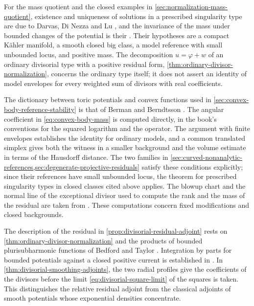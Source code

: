 For the mass quotient and the closed examples in \cref{sec:normalization-mass-quotient}, existence and uniqueness of solutions in a prescribed singularity type are due to Darvas, Di Nezza and Lu \cite[Theorems 1.4(i) and 4.29, pp.~2052 and 2079--2080]{DDNL18mono}, and the invariance of the mass under bounded changes of the potential is their \cite[Proposition 2.1, p.~2055]{DDNL18mono}. Their hypotheses are a compact K\"ahler manifold, a smooth closed big class, a model reference with small unbounded locus, and positive mass. The decomposition $u=\varphi+w$ of an ordinary divisorial type with a positive residual form, \cref{thm:ordinary-divisor-normalization}, concerns the ordinary type itself; it does not assert an identity of model envelopes for every weighted sum of divisors with real coefficients.

The dictionary between toric potentials and convex functions used in \cref{sec:convex-body-reference-stability} is that of Berman and Berndtsson \cite[Sections~2.1--2.3, especially Proposition~2.3 and Lemma~2.5, pp.~660--664]{BBToric13}. The angular coefficient in \eqref{eq:convex-body-mass} is computed directly, in the book's conventions for the squared logarithm and the operator. The argument with finite envelopes establishes the identity for ordinary models, and a common translated simplex gives both the witness in a smaller background and the volume estimate in terms of the Hausdorff distance. The two families in \cref{sec:curved-nonanalytic-references,sec:degenerate-projective-residuals} satisfy these conditions explicitly; since their references have small unbounded locus, the theorem for prescribed singularity types in closed classes cited above applies. The blowup chart and the normal line of the exceptional divisor used to compute the rank and the mass of the residual are taken from \cite[Chapter~VII, equation~(12.2) and Proposition~12.4, pp.~356--357]{DemCADG}. These computations concern fixed modifications and closed backgrounds.

The description of the residual in \cref{prop:divisorial-residual-adjoint} rests on \cref{thm:ordinary-divisor-normalization} and the products of bounded plurisubharmonic functions of Bedford and Taylor \cite[Section~2, pp.~3--10]{BT82}. Integration by parts for bounded potentials against a closed positive current is established in \cite[Theorem~1.14 and Lemma~1.15, pp.~214--217]{BEGZ10}. In \cref{thm:divisorial-smoothing-adjoints}, the two radial profiles give the coefficients of the divisors before the limit \eqref{eq:divisorial-square-limit} of the squares is taken. This distinguishes the relative residual adjoint from the classical adjoints of smooth potentials whose exponential densities concentrate.

